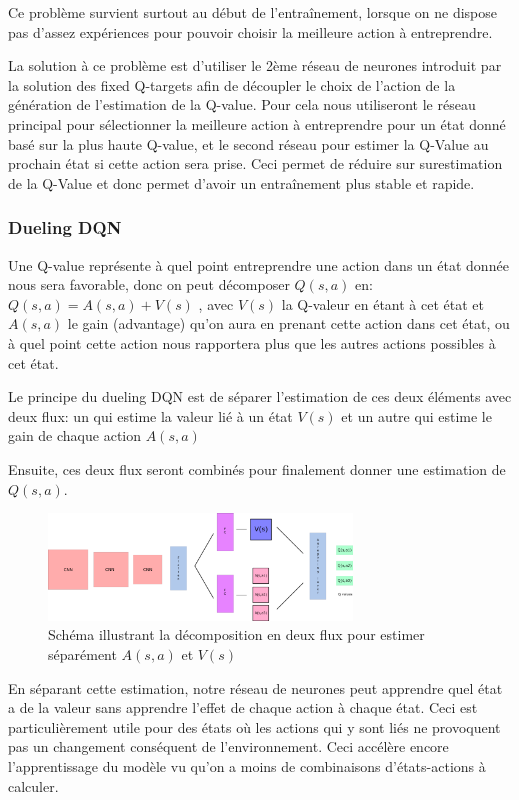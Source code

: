 \documentclass[a4paper,10pt,openany,oneside]{report}
\begin{document}
Ce problème survient surtout au début de l'entraînement, lorsque on ne dispose pas d'assez expériences pour pouvoir choisir la meilleure action à entreprendre.

La solution à ce problème est d'utiliser le 2ème réseau de neurones introduit par la solution des fixed Q-targets afin de découpler le choix de l'action de la génération de l'estimation de la Q-value. Pour cela nous utiliseront le réseau principal pour sélectionner la meilleure action à entreprendre pour un état donné basé sur la plus haute Q-value, et le second réseau pour estimer la Q-Value au prochain état si cette action sera prise. Ceci permet de réduire sur surestimation de la Q-Value et donc permet d'avoir un entraînement plus stable et rapide.
\subsubsection{Dueling DQN}
Une Q-value représente à quel point entreprendre une action dans un état donnée nous sera favorable, donc on peut décomposer $Q(s,a)$ en: $Q(s,a) = A(s,a) + V(s)$ , avec $V(s)$ la Q-valeur en étant à cet état et $A(s,a)$ le gain (advantage) qu'on aura en prenant cette action dans cet état, ou à quel point cette action nous rapportera plus que les autres actions possibles à cet état.

Le principe du dueling DQN est de séparer l'estimation de ces deux éléments avec deux flux: un qui estime la valeur lié à un état $V(s)$ et un autre qui estime le gain de chaque action $A(s,a)$

Ensuite, ces deux flux seront combinés pour finalement donner une estimation de $Q(s,a)$.
\begin{figure}[H]
	\centering
	\includegraphics[width=0.72\textwidth]{img/duelingDqn.png}
	\caption{Schéma illustrant la décomposition en deux flux pour estimer séparément $A(s,a)$ et $V(s)$ \cite[]{freecodecamp}}
\end{figure}
En séparant cette estimation, notre réseau de neurones peut apprendre quel état a de la valeur sans apprendre l'effet de chaque action à chaque état. Ceci est particulièrement utile pour des états où les actions qui y sont liés ne provoquent pas un changement conséquent de l'environnement. Ceci accélère encore l'apprentissage du modèle vu qu'on a moins de combinaisons d'états-actions à calculer.
\end{document}
